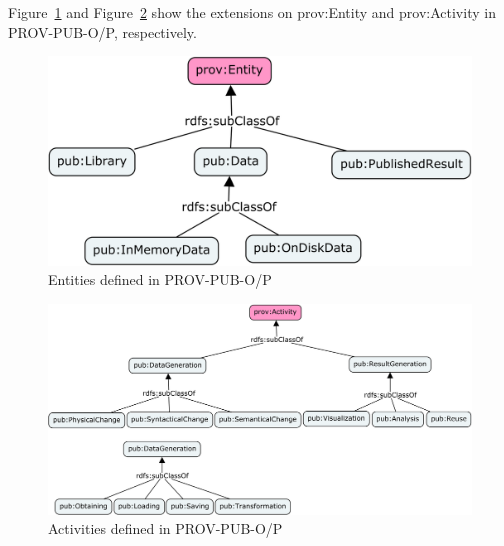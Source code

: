 Figure~\ref{fig:prov-pub-p-entity} and Figure~\ref{fig:prov-pub-p-activity} show the extensions on prov:Entity and prov:Activity in PROV-PUB-O/P, respectively.
\begin{figure}
	\centering
	\includegraphics[width=.8\textwidth]{model/ontology/prov-pub/prov-pub-p-entity.png}
	\caption{Entities defined in PROV-PUB-O/P}
	\label{fig:prov-pub-p-entity}
\end{figure}
\begin{figure}
	\centering
	\includegraphics[width=\textwidth]{model/ontology/prov-pub/prov-pub-p-activity.png}
	\caption{Activities defined in PROV-PUB-O/P}
	\label{fig:prov-pub-p-activity}	
\end{figure}

